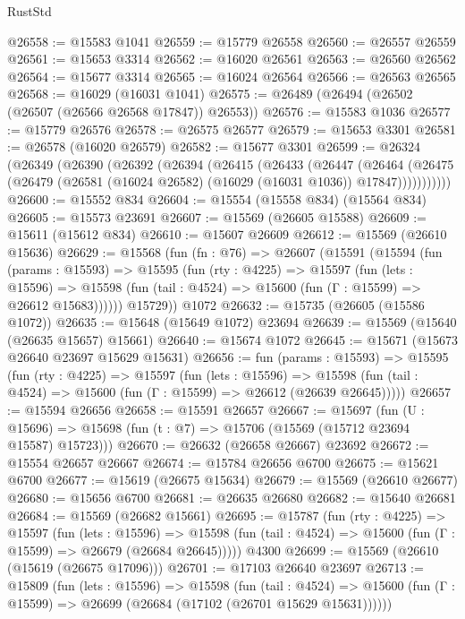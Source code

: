 \begin{lexlean}{RustStd}
\begin{coremodule}
@26558 := @15583 @1041
@26559 := @15779 @26558
@26560 := @26557 @26559
@26561 := @15653 @3314
@26562 := @16020 @26561
@26563 := @26560 @26562
@26564 := @15677 @3314
@26565 := @16024 @26564
@26566 := @26563 @26565
@26568 := @16029 (@16031 @1041)
@26575 := @26489 (@26494 (@26502 (@26507 (@26566 @26568 @17847)) @26553))
@26576 := @15583 @1036
@26577 := @15779 @26576
@26578 := @26575 @26577
@26579 := @15653 @3301
@26581 := @26578 (@16020 @26579)
@26582 := @15677 @3301
@26599 := @26324
    (@26349
      (@26390
        (@26392
          (@26394
            (@26415
              (@26433
                (@26447
                  (@26464
                    (@26475
                      (@26479 (@26581 (@16024 @26582) (@16029 (@16031 @1036)) @17847)))))))))))
@26600 := @15552 @834
@26604 := @15554 (@15558 @834) (@15564 @834)
@26605 := @15573 @23691
@26607 := @15569 (@26605 @15588)
@26609 := @15611 (@15612 @834)
@26610 := @15607 @26609
@26612 := @15569 (@26610 @15636)
@26629 := @15568
    (fun (fn : @76) =>
    @26607
      (@15591
        (@15594
          (fun (params : @15593) =>
          @15595
            (fun (rty : @4225) =>
            @15597
              (fun (lets : @15596) =>
              @15598 (fun (tail : @4524) => @15600 (fun (Γ : @15599) => @26612 @15683))))))
        @15729))
    @1072
@26632 := @15735 (@26605 (@15586 @1072))
@26635 := @15648 (@15649 @1072) @23694
@26639 := @15569 (@15640 (@26635 @15657) @15661)
@26640 := @15674 @1072
@26645 := @15671 (@15673 @26640 @23697 @15629 @15631)
@26656 := fun (params : @15593) =>
  @15595
    (fun (rty : @4225) =>
    @15597
      (fun (lets : @15596) =>
      @15598 (fun (tail : @4524) => @15600 (fun (Γ : @15599) => @26612 (@26639 @26645)))))
@26657 := @15594 @26656
@26658 := @15591 @26657
@26667 := @15697
    (fun (U : @15696) => @15698 (fun (t : @7) => @15706 (@15569 (@15712 @23694 @15587) @15723)))
@26670 := @26632 (@26658 @26667) @23692
@26672 := @15554 @26657 @26667
@26674 := @15784 @26656 @6700
@26675 := @15621 @6700
@26677 := @15619 (@26675 @15634)
@26679 := @15569 (@26610 @26677)
@26680 := @15656 @6700
@26681 := @26635 @26680
@26682 := @15640 @26681
@26684 := @15569 (@26682 @15661)
@26695 := @15787
    (fun (rty : @4225) =>
    @15597
      (fun (lets : @15596) =>
      @15598 (fun (tail : @4524) => @15600 (fun (Γ : @15599) => @26679 (@26684 @26645)))))
    @4300
@26699 := @15569 (@26610 (@15619 (@26675 @17096)))
@26701 := @17103 @26640 @23697
@26713 := @15809
    (fun (lets : @15596) =>
    @15598
      (fun (tail : @4524) =>
      @15600 (fun (Γ : @15599) => @26699 (@26684 (@17102 (@26701 @15629 @15631))))))

\end{coremodule}
\end{lexlean}
